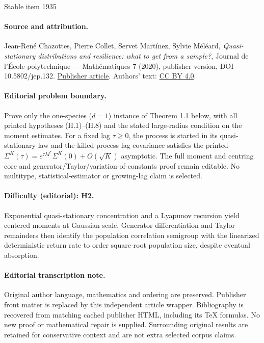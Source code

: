 \documentclass[11pt]{article}
\numberwithin{equation}{section}
\theoremstyle{plain}
\theoremstyle{definition}
\begin{document}
\begin{center}{\Large Stable item 1935}\end{center}
\paragraph{Source and attribution.}
Jean-René Chazottes, Pierre Collet, Servet Martínez, Sylvie Méléard, \emph{Quasi-stationary distributions and resilience: what to get from a sample?}, Journal de l’École polytechnique — Mathématiques 7 (2020), publisher version, DOI 10.5802/jep.132. \href{https://jep.centre-mersenne.org/articles/10.5802/jep.132/}{Publisher article}. Authors' text: \href{https://creativecommons.org/licenses/by/4.0/}{CC BY 4.0}.
\paragraph{Editorial problem boundary.}
Prove only the one-species (\(d=1\)) instance of Theorem 1.1 below, with all printed hypotheses (H.1)--(H.8) and the stated large-radius condition on the moment estimates. For a fixed lag \(\tau\ge0\), the process is started in its quasi-stationary law and the killed-process lag covariance satisfies the printed \(\Sigma^K(\tau)=e^{\tau M^*}\Sigma^K(0)+O(\sqrt K)\) asymptotic. The full moment and centring core and generator/Taylor/variation-of-constants proof remain editable. No multitype, statistical-estimator or growing-lag claim is selected.
\paragraph{Difficulty (editorial): H2.}
Exponential quasi-stationary concentration and a Lyapunov recursion yield centered moments at Gaussian scale. Generator differentiation and Taylor remainders then identify the population correlation semigroup with the linearized deterministic return rate to order square-root population size, despite eventual absorption.
\paragraph{Editorial transcription note.}
Original author language, mathematics and ordering are preserved. Publisher front matter is replaced by this independent article wrapper. Bibliography is recovered from matching cached publisher HTML, including its TeX formulas. No new proof or mathematical repair is supplied. Surrounding original results are retained for conservative context and are not extra selected corpus claims.
\clearpage
\end{document}
